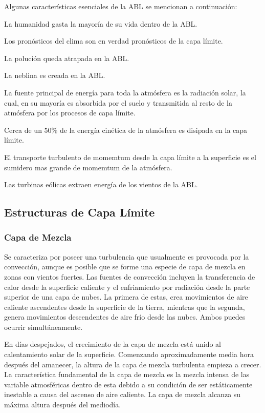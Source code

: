 Algunas características esenciales de la ABL se mencionan a continuación:
\begin{itemize*}
	\item La humanidad gasta la mayoría de su vida dentro de la ABL.
	\item Los pronósticos del clima son en verdad pronósticos de la capa límite.
	\item La polución queda atrapada en la ABL.
	\item La neblina es creada en la ABL.
	\item La fuente principal de energía para toda la atmósfera es la radiación solar, la cual, en su mayoría es absorbida por el suelo y transmitida al resto de la atmósfera por los procesos de capa límite.
	\item Cerca de un 50\% de la energía cinética de la atmósfera es disipada en la capa límite.
	\item El transporte turbulento de momemtum desde la capa límite a la superficie es el sumidero mas grande de momemtum de la atmósfera.
	\item Las turbinas eólicas extraen energía de los vientos de la ABL.
\end{itemize*}
\subsection{Estructuras de Capa Límite}
\subsubsection{Capa de Mezcla}
Se caracteriza por poseer una turbulencia que usualmente es provocada por la convección, aunque es posible que se forme una especie de capa de mezcla en zonas con vientos fuertes. Las fuentes de convección incluyen la transferencia de calor desde la superficie caliente y el enfriamiento por radiación desde la parte superior de una capa de nubes. La primera de estas, crea movimientos de aire caliente ascendentes desde la superficie de la tierra, mientras que la segunda, genera movimientos descendentes de aire frío desde las nubes. Ambos puedes ocurrir simultáneamente.

En días despejados, el crecimiento de la capa de mezcla está unido al calentamiento solar de la superficie. Comenzando aproximadamente media hora después del amanecer, la altura de la capa de mezcla turbulenta empieza a crecer. La característica fundamental de la capa de mezcla es la mezcla intensa de las variable atmosféricas dentro de esta debido a su condición de ser estáticamente inestable a causa del ascenso de aire caliente. La capa de mezcla alcanza su máxima altura después del mediodía.

